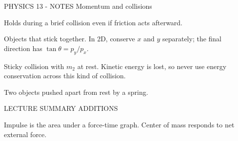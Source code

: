 PHYSICS 13 - NOTES
Momentum and collisions

Holds during a brief collision even if friction acts afterward.

Objects that stick together. In 2D, conserve \(x\) and \(y\) separately; the final direction has \(\tan\theta = p_y/p_x\).

Sticky collision with \(m_2\) at rest. Kinetic energy is lost, so never use energy conservation across this kind of collision.

Two objects pushed apart from rest by a spring.

LECTURE SUMMARY ADDITIONS

Impulse is the area under a force-time graph. Center of mass responds to net external force.
